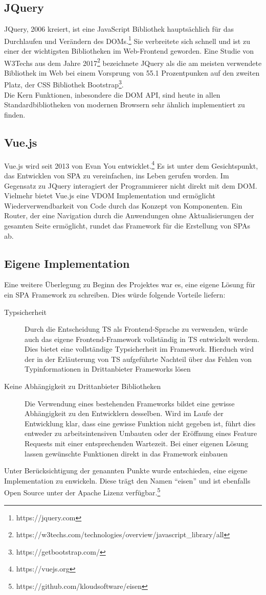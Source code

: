 \subsection{JQuery}
JQuery, 2006 kreiert, ist eine JavaScript Bibliothek hauptsächlich für das
Durchlaufen und Verändern des \ac{DOM}s.\footnote{https://jquery.com} Sie
verbreitete sich schnell und ist zu einer der wichtigsten Bibliotheken im
Web-Frontend geworden. Eine Studie von W3Techs aus dem Jahre 2017\footnote{https://w3techs.com/technologies/overview/javascript\_library/all} bezeichnete
JQuery als die am meisten verwendete Bibliothek im Web bei einem Vorsprung von
55.1 Prozentpunken auf den zweiten Platz, der CSS Bibliothek Bootstrap\footnote{https://getbootstrap.com/}.\\
Die Kern Funktionen, inbesondere die \ac{DOM} \ac{API}, sind heute in allen Standardbibliotheken von
modernen Browsern sehr ähnlich implementiert zu finden.
\subsection{Vue.js}
Vue.js wird seit 2013 von Evan You entwicklet.\footnote{https://vuejs.org} Es
ist unter dem Gesichtspunkt, das Entwicklen von \acl{SPA} zu vereinfachen, ins
Leben gerufen worden. Im Gegensatz zu JQuery interagiert der Programmierer nicht
direkt mit dem \ac{DOM}. Vielmehr bietet Vue.js eine \ac{VDOM} Implementation
und ermöglicht Wiederverwendbarkeit von Code durch das Konzept von Komponenten.
Ein Router, der eine Navigation durch die Anwendungen ohne Aktualisierungen der
gesamten Seite ermöglicht, rundet das Framework für die Erstellung von \acl{SPA}s ab.
\subsection{Eigene Implementation}
Eine weitere Überlegung zu Beginn des Projektes war es, eine eigene Lösung für
ein \ac{SPA} Framework zu schreiben. Dies würde folgende Vorteile liefern:
\begin{description}
\item [Typsicherheit]{Durch die Entscheidung \acl{TS} als Frontend-Sprache zu
    verwenden, würde auch das eigene Frontend-Framework vollständig in \acl{TS}
    entwickelt werdem. Dies bietet eine vollständige Typsicherheit im Framework.
    Hierduch wird der in der Erläuterung von \acl{TS} aufgeführte Nachteil über
    das Fehlen von Typinformationen in Drittanbieter Frameworks lösen}
\item[Keine Abhängigkeit zu Drittanbieter Bibliotheken]{Die Verwendung eines
    bestehenden Frameworks bildet eine gewisse Abhängigkeit zu den Entwicklern
    desselben. Wird im Laufe der Entwicklung klar, dass eine gewisse Funktion
    nicht gegeben ist, führt dies entweder zu arbeitsintensiven Umbauten oder
    der Eröffnung eines Feature Requests mit einer entsprechenden Wartezeit. Bei
    einer eigenen Lösung lassen gewünschte Funktionen direkt in das Framework einbauen}
\end{description}
Unter Berücksichtigung der genannten Punkte wurde entschieden, eine eigene
Implementation zu enwickeln. Diese trägt den Namen ``eisen'' und ist ebenfalls
Open Source unter der Apache Lizenz verfügbar.\footnote{https://github.com/kloudsoftware/eisen}
